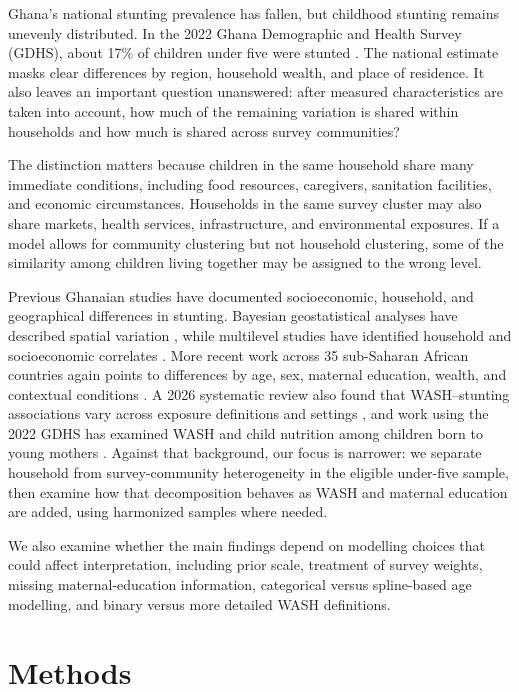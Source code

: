\documentclass[11pt]{article}
\begin{document}
Ghana's national stunting prevalence has fallen, but childhood stunting remains unevenly distributed. In the 2022 Ghana Demographic and Health Survey (GDHS), about 17\% of children under five were stunted \citep{GSSICF2024}. The national estimate masks clear differences by region, household wealth, and place of residence. It also leaves an important question unanswered: after measured characteristics are taken into account, how much of the remaining variation is shared within households and how much is shared across survey communities?

The distinction matters because children in the same household share many immediate conditions, including food resources, caregivers, sanitation facilities, and economic circumstances. Households in the same survey cluster may also share markets, health services, infrastructure, and environmental exposures. If a model allows for community clustering but not household clustering, some of the similarity among children living together may be assigned to the wrong level.

Previous Ghanaian studies have documented socioeconomic, household, and geographical differences in stunting. Bayesian geostatistical analyses have described spatial variation \citep{AhetoDagne2021,AmoakoJohnson2022}, while multilevel studies have identified household and socioeconomic correlates \citep{AhetoEtAl2015,IddrisuGyabaah2023}. More recent work across 35 sub-Saharan African countries again points to differences by age, sex, maternal education, wealth, and contextual conditions \citep{MoloroEtAl2026}. A 2026 systematic review also found that WASH--stunting associations vary across exposure definitions and settings \citep{WijayantoEtAl2026}, and work using the 2022 GDHS has examined WASH and child nutrition among children born to young mothers \citep{OgumEtAl2026}. Against that background, our focus is narrower: we separate household from survey-community heterogeneity in the eligible under-five sample, then examine how that decomposition behaves as WASH and maternal education are added, using harmonized samples where needed.

We also examine whether the main findings depend on modelling choices that could affect interpretation, including prior scale, treatment of survey weights, missing maternal-education information, categorical versus spline-based age modelling, and binary versus more detailed WASH definitions.

\section{Methods}
\end{document}
